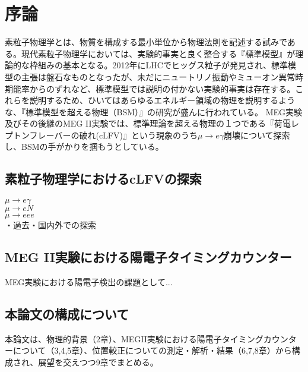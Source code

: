 \documentclass[Yonemoto_master.tex]{subfiles}
\begin{document}
\chapter{序論}
素粒子物理学とは、物質を構成する最小単位から物理法則を記述する試みである。現代素粒子物理学においては、実験的事実と良く整合する『標準模型』が理論的な枠組みの基本となる。2012年にLHCでヒッグス粒子が発見され、標準模型の主張は盤石なものとなったが、未だにニュートリノ振動やミューオン異常時期能率からのずれなど、標準模型では説明の付かない実験的事実は存在する。これらを説明するため、ひいてはあらゆるエネルギー領域の物理を説明するような、『標準模型を超える物理（BSM）』の研究が盛んに行われている。
MEG実験及びその後継のMEG II実験では、標準理論を超える物理の１つである『荷電レプトンフレーバーの破れ(cLFV)』という現象のうち$\mu \to e\gamma$崩壊について探索し、BSMの手がかりを掴もうとしている。

\section{素粒子物理学におけるcLFVの探索}
\noindent $\mu \to e\gamma$ \\
$\mu \to eN$ \\
$\mu \to eee$ \\
・過去・国内外での探索

\section{MEG II実験における陽電子タイミングカウンター}
MEG実験における陽電子検出の課題として...

\section{本論文の構成について}
本論文は、物理的背景（2章）、MEGII実験における陽電子タイミングカウンターについて（3,4,5章）、位置較正についての測定・解析・結果（6,7,8章）から構成され、展望を交えつつ9章でまとめる。
\end{document}
